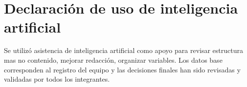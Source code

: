 \documentclass[12pt,a4paper]{article}
\begin{document}
	\section*{Declaración de uso de inteligencia artificial}
	
	Se utilizó asistencia de inteligencia artificial como apoyo para revisar estructura mas no contenido, mejorar redacción, organizar variables. Los datos base corresponden al registro del equipo y las decisiones finales han sido revisadas y validadas por todos los integrantes.
	
\end{document}
